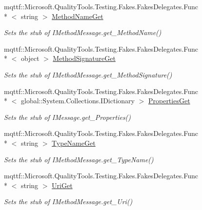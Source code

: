 \begin{DoxyCompactItemize}
mqttf\-::\-Microsoft.\-Quality\-Tools.\-Testing.\-Fakes.\-Fakes\-Delegates.\-Func\\*
$<$ string $>$ \hyperlink{class_system_1_1_runtime_1_1_remoting_1_1_activation_1_1_fakes_1_1_stub_i_construction_call_message_ab35df8ea23a6965db04051f7e9deada6}{Method\-Name\-Get}
\begin{DoxyCompactList}\small\item\em Sets the stub of I\-Method\-Message.\-get\-\_\-\-Method\-Name()\end{DoxyCompactList}\item 
mqttf\-::\-Microsoft.\-Quality\-Tools.\-Testing.\-Fakes.\-Fakes\-Delegates.\-Func\\*
$<$ object $>$ \hyperlink{class_system_1_1_runtime_1_1_remoting_1_1_activation_1_1_fakes_1_1_stub_i_construction_call_message_ac569f1e151e4b5085b3ce2eeb177cf3c}{Method\-Signature\-Get}
\begin{DoxyCompactList}\small\item\em Sets the stub of I\-Method\-Message.\-get\-\_\-\-Method\-Signature()\end{DoxyCompactList}\item 
mqttf\-::\-Microsoft.\-Quality\-Tools.\-Testing.\-Fakes.\-Fakes\-Delegates.\-Func\\*
$<$ global\-::\-System.\-Collections.\-I\-Dictionary $>$ \hyperlink{class_system_1_1_runtime_1_1_remoting_1_1_activation_1_1_fakes_1_1_stub_i_construction_call_message_aa8b84268c727fa8c7b9fab88fcd5de28}{Properties\-Get}
\begin{DoxyCompactList}\small\item\em Sets the stub of I\-Message.\-get\-\_\-\-Properties()\end{DoxyCompactList}\item 
mqttf\-::\-Microsoft.\-Quality\-Tools.\-Testing.\-Fakes.\-Fakes\-Delegates.\-Func\\*
$<$ string $>$ \hyperlink{class_system_1_1_runtime_1_1_remoting_1_1_activation_1_1_fakes_1_1_stub_i_construction_call_message_a83f63a58fc945be752f45e221df234e1}{Type\-Name\-Get}
\begin{DoxyCompactList}\small\item\em Sets the stub of I\-Method\-Message.\-get\-\_\-\-Type\-Name()\end{DoxyCompactList}\item 
mqttf\-::\-Microsoft.\-Quality\-Tools.\-Testing.\-Fakes.\-Fakes\-Delegates.\-Func\\*
$<$ string $>$ \hyperlink{class_system_1_1_runtime_1_1_remoting_1_1_activation_1_1_fakes_1_1_stub_i_construction_call_message_a44127edfcb5098d6cc0f491f61b90e87}{Uri\-Get}
\begin{DoxyCompactList}\small\item\em Sets the stub of I\-Method\-Message.\-get\-\_\-\-Uri()\end{DoxyCompactList}\end{DoxyCompactItemize}


